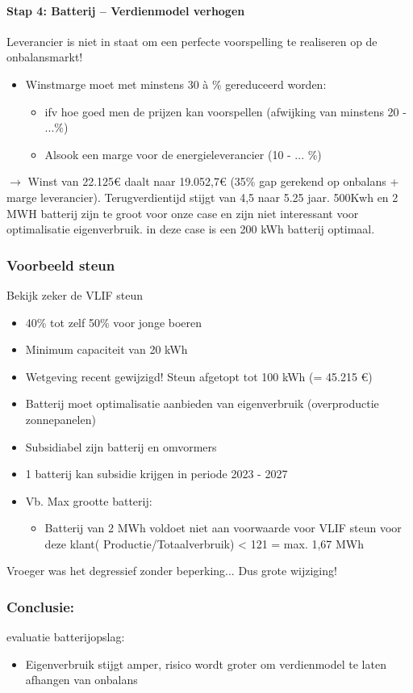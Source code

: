 \documentclass[12pt]{article}
\begin{document}
\paragraph{Stap 4: Batterij – Verdienmodel verhogen}
Leverancier is niet in staat om een perfecte voorspelling te realiseren op de onbalansmarkt!\begin{itemize}
    \item Winstmarge moet met minstens 30 à \% gereduceerd worden:\begin{itemize}
        \item ifv hoe goed men de prijzen kan voorspellen (afwijking van minstens 20 - ...\%)
        \item Alsook een marge voor de energieleverancier (10 - ... \%)
    \end{itemize}
\end{itemize}
$\rightarrow$ Winst van 22.125€ daalt naar 19.052,7€ (35\% gap gerekend op onbalans
+ marge leverancier). Terugverdientijd stijgt van 4,5 naar 5.25 jaar. 500Kwh en 2 MWH batterij zijn te groot voor onze case en zijn niet interessant voor optimalisatie eigenverbruik. in deze case is een 200 kWh batterij optimaal.
\subsubsection{Voorbeeld steun}
Bekijk zeker de VLIF steun\begin{itemize}
    \item 40\% tot zelf 50\% voor jonge boeren
    \item Minimum capaciteit van 20 kWh 
    \item Wetgeving recent gewijzigd! Steun afgetopt tot 100 kWh (= 45.215 €) 
    \item Batterij moet optimalisatie aanbieden van eigenverbruik (overproductie zonnepanelen) 
    \item Subsidiabel zijn batterij en omvormers 
    \item 1 batterij kan subsidie krijgen in periode 2023 - 2027
    \item Vb. Max grootte batterij:\begin{itemize}
        \item Batterij van 2 MWh voldoet niet aan voorwaarde voor VLIF steun voor
        deze klant( Productie/Totaalverbruik) < 121 = max. 1,67 MWh
    \end{itemize}
\end{itemize}
Vroeger was het degressief zonder beperking... Dus grote wijziging!
\subsubsection{Conclusie:}
evaluatie batterijopslag:\begin{itemize}
    \item Eigenverbruik stijgt amper, risico wordt groter om verdienmodel te laten afhangen van onbalans
\end{itemize}
\end{document}
